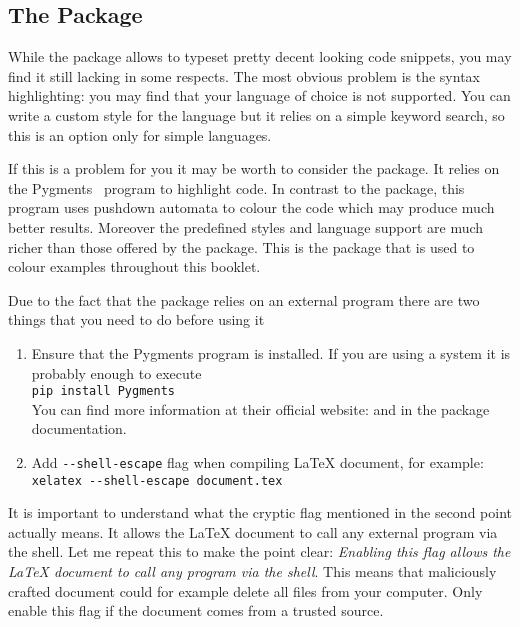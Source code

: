 \subsection{The  Package}

While the  package allows to typeset pretty decent looking code
snippets, you may find it still lacking in some respects. The most obvious
problem is the syntax highlighting: you may find that your language of choice
is not supported. You can write a custom style for the language but it relies
on a simple keyword search, so this is an option only for simple languages.

If this is a problem for you it may be worth to consider the 
package. It relies on the Pygments~\cite{pygments} program to highlight code.
In contrast to the  package, this program uses pushdown automata
to colour the code which may produce much better results. Moreover the
predefined styles and language support are much richer than those offered by
the  package. This is the package that is used to colour examples
throughout this booklet.

Due to the fact that the  package relies on an external program
there are two things that you need to do before using it
\begin{enumerate}
  \item Ensure that the Pygments program is installed. If you are using a
        \Unix{} system it is probably enough to execute\\
        \verb|pip install Pygments|\\
        You can find more information at their official website:
         and in the  package documentation.

  \item
        Add \verb|--shell-escape| flag when compiling \LaTeX{} document, for
        example:\\
        \verb|xelatex --shell-escape document.tex|
\end{enumerate}
It is important to understand what the cryptic flag mentioned in the second
point actually means. It allows the \LaTeX{} document to call any external program via
the shell. Let me repeat this to make the point clear: \emph{Enabling this flag
  allows the \LaTeX{} document to call any program via the shell}. This means that
maliciously crafted document could for example delete all files from your
computer. Only enable this flag if the document comes from a trusted source.

